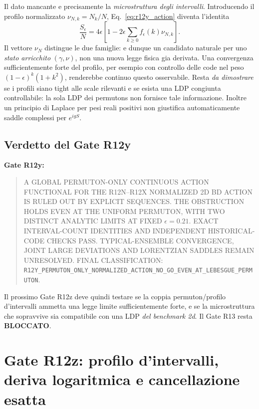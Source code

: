 \documentclass[11pt,a4paper]{article}
\newcommand{\status}[1]{\textsf{#1}}
\begin{document}
Il dato mancante e precisamente la \emph{microstruttura degli intervalli}. Introducendo il profilo normalizzato $\nu_{N,k}=N_k/N$, Eq.~\eqref{eq:r12y_action} diventa l'identita
\begin{equation}
 \frac{S_\epsilon}{N}=4\epsilon\left[1-2\epsilon\sum_{k\ge0}f_\epsilon(k)\nu_{N,k}\right].\label{eq:r12y_microprofile}
\end{equation}
Il vettore $\nu_N$ distingue le due famiglie: e dunque un candidato naturale per uno \emph{stato arricchito} $(\gamma,\nu)$, non una nuova legge fisica gia derivata. Una convergenza sufficientemente forte del profilo, per esempio con controllo delle code nel peso $(1-\epsilon)^k(1+k^2)$, renderebbe continuo questo osservabile. Resta \emph{da dimostrare} se i profili siano tight alle scale rilevanti e se esista una LDP congiunta controllabile: la sola LDP dei permutons non fornisce tale informazione. Inoltre un principio di Laplace per pesi reali positivi non giustifica automaticamente saddle complessi per $e^{igS}$.

\subsection{Verdetto del Gate R12y}

\textbf{Gate R12y:}
\begin{quote}
\status{A GLOBAL PERMUTON-ONLY CONTINUOUS ACTION FUNCTIONAL FOR THE R12N--R12X NORMALIZED 2D BD ACTION IS RULED OUT BY EXPLICIT SEQUENCES. THE OBSTRUCTION HOLDS EVEN AT THE UNIFORM PERMUTON, WITH TWO DISTINCT ANALYTIC LIMITS AT FIXED $\epsilon=0.21$. EXACT INTERVAL-COUNT IDENTITIES AND INDEPENDENT HISTORICAL-CODE CHECKS PASS. TYPICAL-ENSEMBLE CONVERGENCE, JOINT LARGE DEVIATIONS AND LORENTZIAN SADDLES REMAIN UNRESOLVED. FINAL CLASSIFICATION:} \nolinkurl{R12Y_PERMUTON_ONLY_NORMALIZED_ACTION_NO_GO_EVEN_AT_LEBESGUE_PERMUTON}.
\end{quote}

Il prossimo Gate R12z deve quindi testare se la coppia permuton/profilo d'intervalli ammetta una legge limite sufficientemente forte, e se la microstruttura che sopravvive sia compatibile con una LDP \emph{del benchmark 2d}. Il Gate R13 resta \textbf{BLOCCATO}.



\section{Gate R12z: profilo d'intervalli, deriva logaritmica e cancellazione esatta}
\label{sec:r12z}
\end{document}
